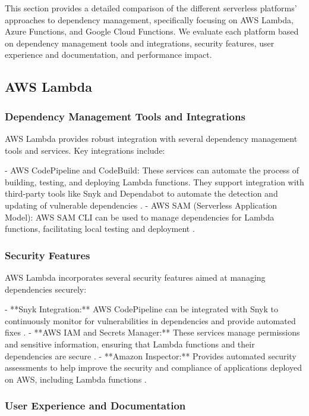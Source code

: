 \documentclass[sigconf]{acmart}
\begin{document}
This section provides a detailed comparison of the different serverless platforms' approaches to dependency management, specifically focusing on AWS Lambda, Azure Functions, and Google Cloud Functions. We evaluate each platform based on dependency management tools and integrations, security features, user experience and documentation, and performance impact.

\subsection{AWS Lambda}

\subsubsection{Dependency Management Tools and Integrations}

AWS Lambda provides robust integration with several dependency management tools and services. Key integrations include:

- AWS CodePipeline and CodeBuild: These services can automate the process of building, testing, and deploying Lambda functions. They support integration with third-party tools like Snyk and Dependabot to automate the detection and updating of vulnerable dependencies \cite{awsCI2023}.
- AWS SAM (Serverless Application Model): AWS SAM CLI can be used to manage dependencies for Lambda functions, facilitating local testing and deployment \cite{awssam2023}.

\subsubsection{Security Features}

AWS Lambda incorporates several security features aimed at managing dependencies securely:

- **Snyk Integration:** AWS CodePipeline can be integrated with Snyk to continuously monitor for vulnerabilities in dependencies and provide automated fixes \cite{snykaws2023}.
- **AWS IAM and Secrets Manager:** These services manage permissions and sensitive information, ensuring that Lambda functions and their dependencies are secure \cite{awsSecurity2023}.
- **Amazon Inspector:** Provides automated security assessments to help improve the security and compliance of applications deployed on AWS, including Lambda functions \cite{awsinspector2023}.

\subsubsection{User Experience and Documentation}
\end{document}
